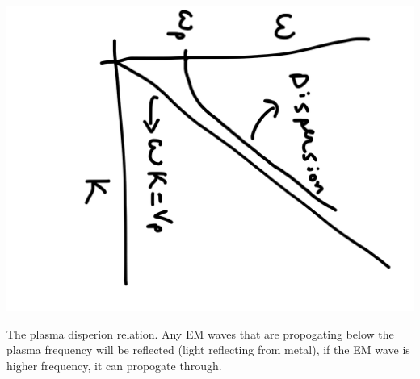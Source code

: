 \documentclass[12pt,letterpaper, titlepage]{article}
\begin{document}
\begin{marginfigure}
    \includegraphics[angle=90, width =\marginparwidth]{../figures/disp.png}
    \caption{The plasma disperion relation. Any EM waves that are propogating
        below the plasma frequency will be reflected (light reflecting from
        metal), if the EM wave is higher frequency, it can propogate through.}
    \end{marginfigure}

\end{document}

